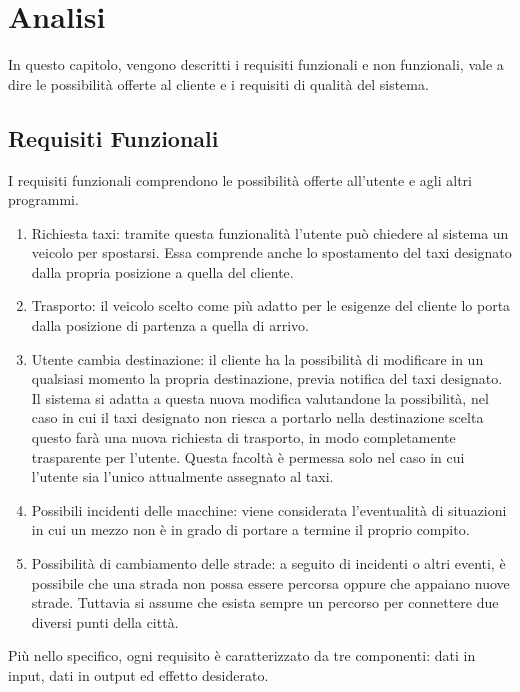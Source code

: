
\chapter{Analisi}

In questo capitolo, vengono descritti i requisiti funzionali e non funzionali, vale a dire le possibilità offerte al cliente e i requisiti di qualità del sistema.

\section{Requisiti Funzionali}\label{requisiti_funzionali}

I requisiti funzionali comprendono le possibilità offerte all'utente e agli altri programmi.

\begin{enumerate}
	\item Richiesta taxi: tramite questa funzionalità l'utente può chiedere al sistema un veicolo per spostarsi. Essa comprende anche lo spostamento del taxi designato dalla propria posizione a quella del cliente.
	\item Trasporto: il veicolo scelto come più adatto per le esigenze del cliente lo porta dalla posizione di partenza a quella di arrivo.
	\item Utente cambia destinazione: il cliente ha la possibilità di modificare in un qualsiasi momento la propria destinazione, previa notifica del taxi designato. Il sistema si adatta a questa nuova modifica valutandone la possibilità, nel caso in cui il taxi designato non riesca a portarlo nella destinazione scelta questo farà una nuova richiesta di trasporto, in modo completamente trasparente per l'utente. Questa facoltà è permessa solo nel caso in cui l'utente sia l'unico attualmente assegnato al taxi.
	\item Possibili incidenti delle macchine: viene considerata l'eventualità di situazioni in cui un mezzo non è in grado di portare a termine il proprio compito.
	\item Possibilità di cambiamento delle strade: a seguito di incidenti o altri eventi, è possibile che una strada non possa essere percorsa oppure che appaiano nuove strade. Tuttavia si assume che esista sempre un percorso per connettere due diversi punti della città.
\end{enumerate}

Più nello specifico, ogni requisito è caratterizzato da tre componenti: dati in input, dati in output ed effetto desiderato.

